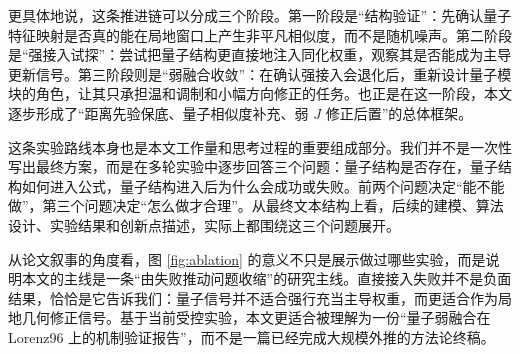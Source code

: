 更具体地说，这条推进链可以分成三个阶段。第一阶段是“结构验证”：先确认量子特征映射是否真的能在局地窗口上产生非平凡相似度，而不是随机噪声。第二阶段是“强接入试探”：尝试把量子结构更直接地注入同化权重，观察其是否能成为主导更新信号。第三阶段则是“弱融合收敛”：在确认强接入会退化后，重新设计量子模块的角色，让其只承担温和调制和小幅方向修正的任务。也正是在这一阶段，本文逐步形成了“距离先验保底、量子相似度补充、弱 $J$ 修正后置”的总体框架。

这条实验路线本身也是本文工作量和思考过程的重要组成部分。我们并不是一次性写出最终方案，而是在多轮实验中逐步回答三个问题：量子结构是否存在，量子结构如何进入公式，量子结构进入后为什么会成功或失败。前两个问题决定“能不能做”，第三个问题决定“怎么做才合理”。从最终文本结构上看，后续的建模、算法设计、实验结果和创新点描述，实际上都围绕这三个问题展开。

从论文叙事的角度看，图 \ref{fig:ablation} 的意义不只是展示做过哪些实验，而是说明本文的主线是一条“由失败推动问题收缩”的研究主线。直接接入失败并不是负面结果，恰恰是它告诉我们：量子信号并不适合强行充当主导权重，而更适合作为局地几何修正信号。基于当前受控实验，本文更适合被理解为一份“量子弱融合在 Lorenz96 上的机制验证报告”，而不是一篇已经完成大规模外推的方法论终稿。
